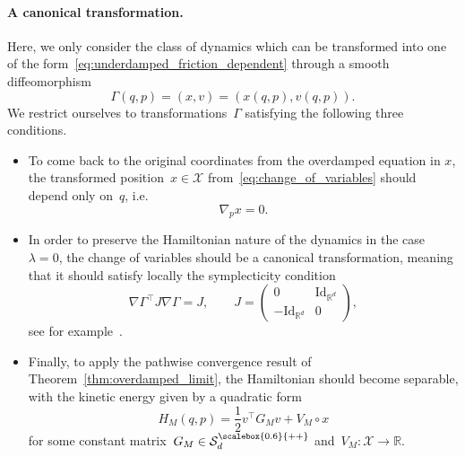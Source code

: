 \documentclass[10pt]{article}
\newcommand{\R}{\mathbb{R}}
\newcommand{\cX}{\mathcal{X}}
\newcommand{\cSpd}{\mathcal{S}_d^{\scalebox{0.6}{++}}}
\newcommand{\1}{\mathbbm 1}
\begin{document}
\paragraph{A canonical transformation.}
Here, we only consider the class of dynamics which can be transformed into one of the form~\eqref{eq:underdamped_friction_dependent} through a smooth diffeomorphism
\begin{equation}
    \label{eq:change_of_variables}
    \Gamma(q,p) = \left(x,v\right) = \left(x(q,p),v(q,p)\right).
\end{equation}
We restrict ourselves to transformations~$\Gamma$ satisfying the following three conditions.
\begin{itemize}
    \item{To come back to the original coordinates from the overdamped equation in $x$, the transformed position~$x\in\cX$ from~\eqref{eq:change_of_variables} should depend only on~$q$, i.e.
    \begin{equation}
    \label{eq:x_const_wrt_p}
    \nabla_p x = 0.
    \end{equation}}
    \item{In order to preserve the Hamiltonian nature of the dynamics in the case~$\lambda=0$, the change of variables should be a canonical transformation, meaning that it should satisfy locally the symplecticity condition
    \begin{equation}
    \label{eq:symplecticity}
    \nabla \Gamma^\top J \nabla\Gamma = J,\qquad J = \begin{pmatrix}
        0 & \mathrm{Id}_{\R^d}\\ -\mathrm{Id}_{\R^d}&0
    \end{pmatrix},
\end{equation}
see for example~\cite[Chapter 8]{A89}.}
    \item{
        Finally, to apply the pathwise convergence result of Theorem~\ref{thm:overdamped_limit}, the Hamiltonian should become separable, with the kinetic energy given by a quadratic form
        \begin{equation}
            \label{eq:separability}
            H_M(q,p) = \frac12 v^\top G_M v + V_M\circ x
        \end{equation}
        for some constant matrix~$G_M\in\cSpd$ and~$V_M:\cX\to\R$.
    }
\end{itemize}
\end{document}
